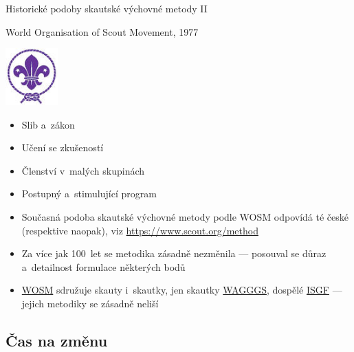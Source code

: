 \documentclass[compress, ucs, xelatex, xcolor=dvipsnames, print,
  hyperref={
    bookmarks=true,
    unicode=true,
    colorlinks=true,
    plainpages=false,
    pdfkeywords={Skaut, Junak, Skauting, Vychovna metoda},
    linkcolor=Black,
    anchorcolor=Black,
    citecolor=OliveGreen,
    filecolor=OliveGreen,
    menucolor=Black,
    urlcolor=OliveGreen,
    pdftex}
  ]{beamer}
\begin{document}
\begin{frame}{Historické podoby skautské výchovné metody II}
  \begin{multicols}{2}
    World Organisation of Scout Movement, 1977
    \begin{center}
      \includegraphics[width=2cm]{wosm.jpg}
    \end{center}
    \begin{itemize}
      \item Slib a~zákon
      \item Učení se zkušeností
      \item Členství v~malých skupinách
      \item Postupný a~stimulující program
    \end{itemize}
  \end{multicols}
  \begin{itemize}
    \item Současná podoba skautské výchovné metody podle WOSM odpovídá té české (respektive naopak), viz \url{https://www.scout.org/method}
    \item Za více jak 100~let se metodika zásadně nezměnila --- posouval se důraz a~detailnost formulace některých bodů
    \item \href{https://www.scout.org/}{WOSM} sdružuje skauty i~skautky, jen skautky \href{https://www.wagggs.org/}{WAGGGS}, dospělé \href{http://www.isgf.org/}{ISGF} --- jejich metodiky se zásadně neliší
  \end{itemize}
\end{frame}

\subsection{Čas na změnu}
\end{document}
